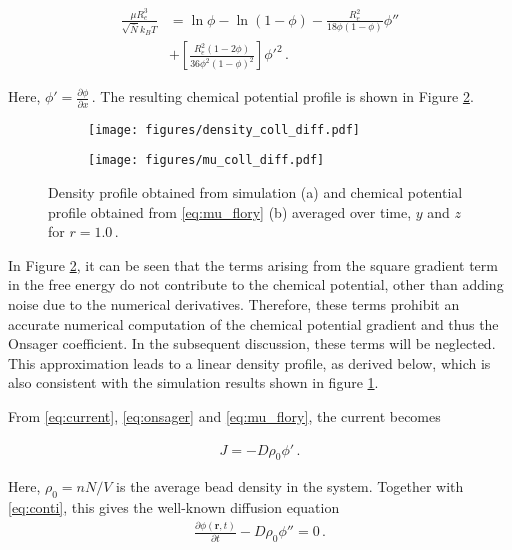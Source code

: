 \documentclass[bachelor,       %
               twoside,        %
               BCOR10mm,       %
                ngerman,english  %
               ]{GAUBM}
\begin{document}
\begin{align}
  \frac{\mu R_e^3}{\sqrt{\bar N} k_BT}&=\ln\phi-\ln(1-\phi)-\frac{R_e^2}{18\phi(1-\phi)}\phi''\nonumber \\ &+\left[\frac{R_e^2(1-2\phi)}{36\phi^2(1-\phi)^2}\right]\phi'^2\,.
  \label{eq:mu_flory}
\end{align}

Here, $\phi'=\frac{\partial\phi}{\partial x}\,.$ The resulting chemical potential profile is shown in Figure \ref{fig:chemical_potential}.




\begin{figure}[h]
  \centering
  \begin{subfigure}[b]{0.45\textwidth}
      \centering
      \texttt{[image: figures/density\_coll\_diff.pdf]}
      \caption{}
      \label{fig:density_profile}
  \end{subfigure}
  \hfill
  \begin{subfigure}[b]{0.45\textwidth}
      \centering
      \texttt{[image: figures/mu\_coll\_diff.pdf]}
      \caption{}
      \label{fig:chemical_potential}
  \end{subfigure}
     \caption{Density profile obtained from simulation (a) and chemical potential profile obtained from \eqref{eq:mu_flory} (b)  averaged over time, $y$ and $z$ for $r=1.0\,$. }
     \label{fig:mu_phi}
\end{figure}


In Figure \ref{fig:chemical_potential}, it can be seen that the terms arising from the square gradient term in the free energy do not contribute to the chemical potential, other than adding noise due to the numerical derivatives. Therefore, these terms prohibit an accurate numerical computation of the chemical potential gradient and thus the Onsager coefficient. In the subsequent discussion, these terms will be neglected. This approximation leads to a linear density profile, as derived below, which is also consistent with the simulation results shown in figure \ref{fig:density_profile}.

From \eqref{eq:current}, \eqref{eq:onsager} and \eqref{eq:mu_flory}, the current becomes


\begin{align}
  J=-D\rho_0\phi'\,.
  \label{eq:current_a}
\end{align}



Here, $\rho_0=nN/V$ is the average bead density in the system. Together with \eqref{eq:conti}, this gives the well-known diffusion equation
\begin{align}
  \frac{\partial\phi(\mathbf r, t)}{\partial t}-D\rho_0  \phi''=0\,.
  \label{eq:diffusion}
\end{align}
\end{document}
